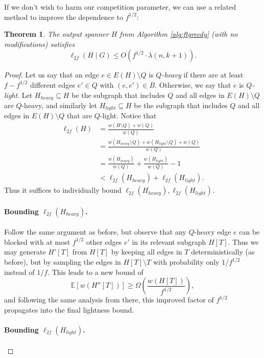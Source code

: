 \documentclass{article}
\theoremstyle{plain}
\newtheorem{theorem}{Theorem}
\theoremstyle{definition}
\begin{document}
If we don't wish to harm our competition parameter, we can use a related method to improve the dependence to $f^{1/2}$:
\begin{theorem} \label{thm:warmupgoodf}
The output spanner $H$ from Algorithm \ref{alg:ftgreedy} (with no modifications) satisfies
$$\ell_{2f}(H \mid G) \le O\left( f^{1/2} \cdot \lambda(n, k+1) \right).$$
\end{theorem}
\begin{proof}
Let us say that an edge $e \in E(H) \setminus Q$ is \emph{$Q$-heavy} if there are at least $f - f^{1/2}$ different edges $e' \in Q$ with $(e, e') \in B$.
Otherwise, we say that $e$ is \emph{$Q$-light}.
Let $H_{heavy} \subseteq H$ be the subgraph that includes $Q$ and all edges in $E(H) \setminus Q$ are $Q$-heavy, and similarly let $H_{light} \subseteq H$ be the subgraph that includes $Q$ and all edges in $E(H) \setminus Q$ that are $Q$-light.
Notice that
\begin{align*}
\ell_{2f}(H) &= \frac{w(H \setminus Q) + w(Q)}{w(Q)} \\
&= \frac{w(H_{heavy} \setminus Q) + w(H_{light} \setminus Q) + w(Q)}{w(Q)} \\
&= \frac{w(H_{heavy})}{w(Q)} + \frac{w(H_{light})}{w(Q)} - 1\\
&< \ell_{2f}(H_{heavy}) + \ell_{2f}(H_{light}).
\end{align*}
Thus it suffices to individually bound $\ell_{2f}(H_{heavy}), \ell_{2f}(H_{light})$.

\paragraph{Bounding $\ell_{2f}(H_{heavy})$.}

Follow the same argument as before, but observe that any $Q$-heavy edge $e$ can be blocked with at most $f^{1/2}$ other edges $e'$ in its relevant subgraph $H[T]$.
Thus we may generate $H'[T]$ from $H[T]$ by keeping all edges in $T$ deterministically (as before), but by sampling the edges in $H[T] \setminus T$ with probability only $1/f^{1/2}$ instead of $1/f$.
This leads to a new bound of
$$\mathbb{E}\left[w(H''[T])\right] \ge \Omega\left( \frac{w(H[T])}{f^{1/2}} \right),$$
and following the same analysis from there, this improved factor of $f^{1/2}$ propagates into the final lightness bound.

\paragraph{Bounding $\ell_{2f}(H_{light})$.}


\end{proof}
\end{document}
